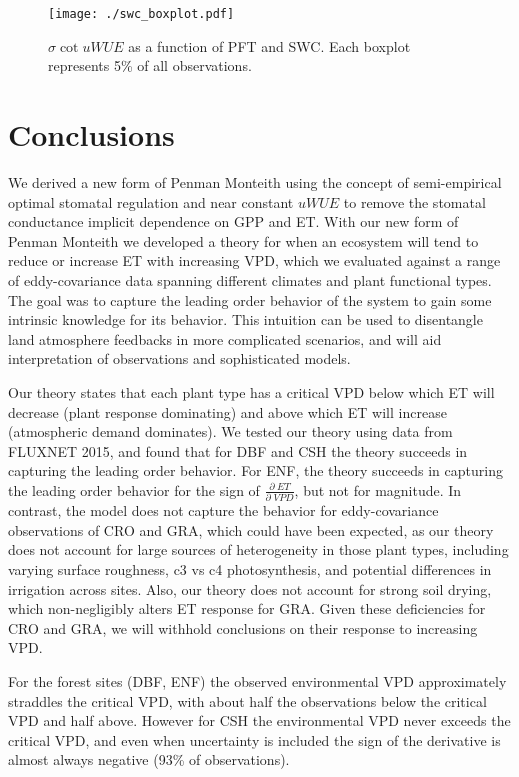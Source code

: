 \documentclass[draft,linenumbers]{agujournal}
\begin{document}
\begin{figure}[h]
\centering
\texttt{[image: ./swc\_boxplot.pdf]}
\caption{$\sigma \cot uWUE$ as a function of PFT and SWC. Each boxplot represents 5\% of all observations.}
\label{swc}
\end{figure}

\section{Conclusions} 

We derived a new form of Penman Monteith using the concept of semi-empirical optimal stomatal regulation \citep{Lin_2015, MEDLYN_2011} and near constant $uWUE$ \citep{Zhou_2015} to remove the stomatal conductance implicit dependence on GPP and ET. With our new form of Penman Monteith we developed a theory for when an ecosystem will tend to reduce or increase ET with increasing VPD, which we evaluated against a range of eddy-covariance data spanning different climates and plant functional types. The goal was to capture the leading order behavior of the system to gain some intrinsic knowledge for its behavior. This intuition can be used to disentangle land atmosphere feedbacks in more complicated scenarios, and will aid interpretation of observations and sophisticated models.

Our theory states that each plant type has a critical VPD below which ET will decrease (plant response dominating) and above which ET will increase (atmospheric demand dominates). We tested our theory using data from FLUXNET 2015, and found that for DBF and CSH the theory succeeds in capturing the leading order behavior. For ENF, the theory succeeds in capturing the leading order behavior for the sign of $\frac{\partial \; ET}{\partial \; VPD}$, but not for magnitude. In contrast, the model does not capture the behavior for eddy-covariance observations of CRO and GRA, which could have been expected, as our theory does not account for large sources of heterogeneity in those plant types, including varying surface roughness, c3 vs c4 photosynthesis, and potential differences in irrigation across sites. Also, our theory does not account for strong soil drying, which non-negligibly alters ET response for GRA. Given these deficiencies for CRO and GRA, we will withhold conclusions on their response to increasing VPD.

For the forest sites (DBF, ENF) the observed environmental VPD approximately straddles the critical VPD, with about half the observations below the critical VPD and half above. However for CSH the environmental VPD never exceeds the critical VPD, and even when uncertainty is included the sign of the derivative is almost always negative (93\% of observations).
\end{document}
